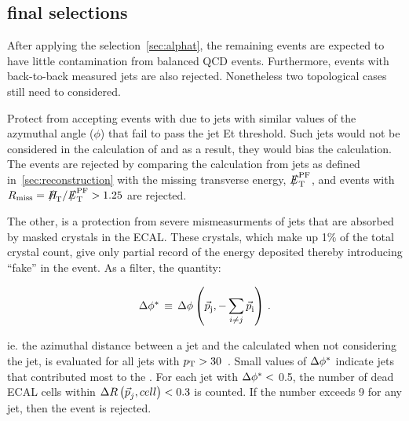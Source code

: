 

\subsection{final selections\label{finalselection}}

After applying the \alphat selection~\ref{sec:alphat}, the remaining 
events are expected to have little contamination from balanced QCD events.  
Furthermore, events with back-to-back measured jets are also rejected. Nonetheless
two topological cases still need to considered.

Protect from accepting events with \mht due to jets with similar values of 
the azymuthal angle ($\phi$) that fail to pass the jet Et threshold. Such jets would
not be considered in the calculation of \scalht and as a result, they would bias the 
\mht calculation. The events are rejected by comparing the \met calculation from 
jets as defined in~\ref{sec:reconstruction} with the missing transverse energy, 
$\pfmet$, and events with $R_{\rm miss}=\mht/\pfmet > 1.25$ are rejected.

The other, is a protection from severe mismeasurments of jets that are absorbed
by masked crystals in the ECAL. These crystals, which make up 1\% of the 
total crystal count, give only partial record of the energy deposited thereby introducing
``fake'' \mht in the event. As a filter, the quantity:

\begin{equation}
  \label{eq:dphistart}
  \mbox{$\Delta\phi^{*}$}\, \equiv \,\Delta\phi \left(\mbox{$\vec{p}$}_{\rm j}, -\sum_{i\neq j} \mbox{$\vec{p}$}_{{\rm i}}\right)\, .
\end{equation}

ie. the azimuthal distance between a jet and the \mht calculated when not considering the jet,
is evaluated for all jets with ${p_{\text T}}>30$~\gev.  Small values of $\mbox{$\Delta\phi^{*}$}$ indicate jets 
that contributed most to the \mht.  For each jet with $\mbox{$\Delta\phi^{*}$} <$ 0.5, the number of dead
ECAL cells within $\Delta R \left(\mbox{$\vec{p}$}_{j},cell\right) < 0.3$ is counted. If the number exceeds 
9 for any jet, then the event is rejected. 

